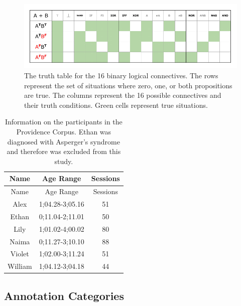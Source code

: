 \documentclass[,man,floatsintext]{apa6}
\begin{document}
\begin{figure}[tb]

{\centering \includegraphics{figs/logicalConnectives-1} 

}

\caption{The truth table for the 16 binary logical connectives. The rows represent the set of situations where zero, one, or both propositions are true. The columns represent the 16 possible connectives and their truth conditions. Green cells represent true situations.}\label{fig:logicalConnectives}
\end{figure}

\begin{longtable}[]{@{}ccc@{}}
\caption{\label{tab:providence} Information on the participants in the Providence Corpus. Ethan was diagnosed with Asperger's syndrome and therefore was excluded from this study.}\tabularnewline
\toprule
Name & Age Range & Sessions\tabularnewline
\midrule
\endfirsthead
\toprule
Name & Age Range & Sessions\tabularnewline
\midrule
\endhead
Alex & 1;04.28-3;05.16 & 51\tabularnewline
Ethan & 0;11.04-2;11.01 & 50\tabularnewline
Lily & 1;01.02-4;00.02 & 80\tabularnewline
Naima & 0;11.27-3;10.10 & 88\tabularnewline
Violet & 1;02.00-3;11.24 & 51\tabularnewline
William & 1;04.12-3;04.18 & 44\tabularnewline
\bottomrule
\end{longtable}

\hypertarget{annotation-categories-1}{%
\subsection{Annotation Categories}\label{annotation-categories-1}}
\end{document}
